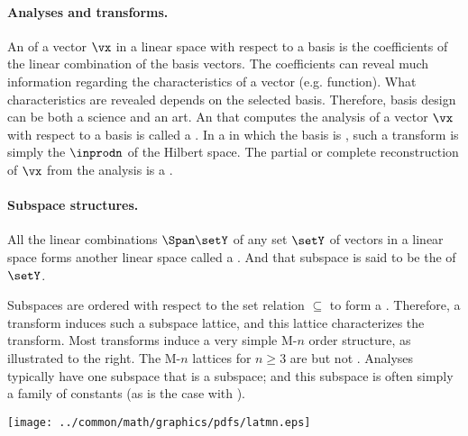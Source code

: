 \paragraph{Analyses and transforms.}
An \footnotemark of a vector $\vx$ in a linear space with respect to a basis is the coefficients
of the linear combination of the basis vectors.
The coefficients can reveal much information regarding the characteristics of a vector (e.g. function).
What characteristics are revealed depends on the selected basis.
Therefore, basis design can be both a science and an art.
An  that computes the analysis of a vector $\vx$ with respect to a basis is called a .
In a  in which the basis is , such a transform is simply the  $\inprodn$ of the Hilbert space.
The partial or complete reconstruction of $\vx$ from the analysis is a .%

\paragraph{Subspace structures.}
All the linear combinations $\Span\setY$ of any set $\setY$ of vectors in a linear space forms another linear space 
called a .
And that subspace is said to be the  of $\setY$. 
\\
\begin{minipage}{\tw-65mm}%
  Subspaces are ordered with respect to the set relation $\subseteq$ to form a .
  Therefore, a transform induces such a subspace lattice, 
  and this lattice characterizes the transform.
  Most transforms induce a very simple M-$n$ order structure,
  as illustrated to the right.
  The M-$n$ lattices for $n\ge3$ are  but not .
  Analyses typically have one subspace that is a  subspace;
  and this subspace is often simply a family of constants
  (as is the case with ).\footnotemark
\end{minipage}%
\hfill%
{\begin{minipage}{60mm}%
  \texttt{[image: ../common/math/graphics/pdfs/latmn.eps]}%
\end{minipage}}%


